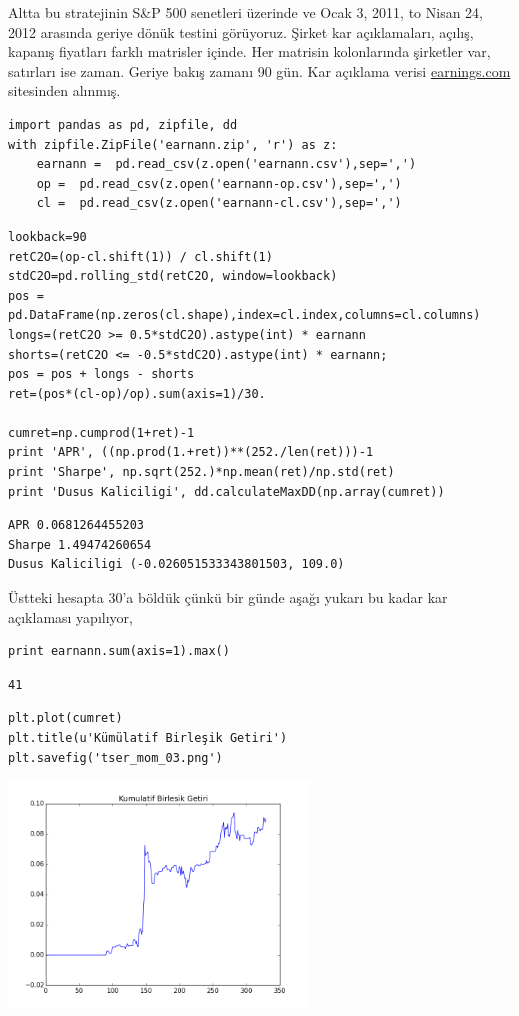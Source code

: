 \documentclass[12pt,fleqn]{article}\usepackage{../../common}
\begin{document}
Altta bu stratejinin S\&P 500 senetleri üzerinde ve Ocak 3, 2011, to Nisan
24, 2012 arasında geriye dönük testini görüyoruz. Şirket kar açıklamaları,
açılış, kapanış fiyatları farklı matrisler içinde. Her matrisin
kolonlarında şirketler var, satırları ise zaman. Geriye bakış zamanı 90
gün. Kar açıklama verisi \url{earnings.com} sitesinden alınmış.

\begin{verbatim}
import pandas as pd, zipfile, dd
with zipfile.ZipFile('earnann.zip', 'r') as z:
    earnann =  pd.read_csv(z.open('earnann.csv'),sep=',')
    op =  pd.read_csv(z.open('earnann-op.csv'),sep=',')
    cl =  pd.read_csv(z.open('earnann-cl.csv'),sep=',')
\end{verbatim}

\begin{verbatim}
lookback=90
retC2O=(op-cl.shift(1)) / cl.shift(1)
stdC2O=pd.rolling_std(retC2O, window=lookback)
pos = pd.DataFrame(np.zeros(cl.shape),index=cl.index,columns=cl.columns)
longs=(retC2O >= 0.5*stdC2O).astype(int) * earnann
shorts=(retC2O <= -0.5*stdC2O).astype(int) * earnann;
pos = pos + longs - shorts
ret=(pos*(cl-op)/op).sum(axis=1)/30.

cumret=np.cumprod(1+ret)-1
print 'APR', ((np.prod(1.+ret))**(252./len(ret)))-1
print 'Sharpe', np.sqrt(252.)*np.mean(ret)/np.std(ret)
print 'Dusus Kaliciligi', dd.calculateMaxDD(np.array(cumret))
\end{verbatim}

\begin{verbatim}
APR 0.0681264455203
Sharpe 1.49474260654
Dusus Kaliciligi (-0.026051533343801503, 109.0)
\end{verbatim}

Üstteki hesapta 30'a böldük çünkü bir günde aşağı yukarı bu kadar kar
açıklaması yapılıyor, 

\begin{verbatim}
print earnann.sum(axis=1).max()
\end{verbatim}

\begin{verbatim}
41
\end{verbatim}

\begin{verbatim}
plt.plot(cumret)
plt.title(u'Kümülatif Birleşik Getiri')
plt.savefig('tser_mom_03.png')
\end{verbatim}

\includegraphics[height=6cm]{tser_mom_03.png}
\end{document}

